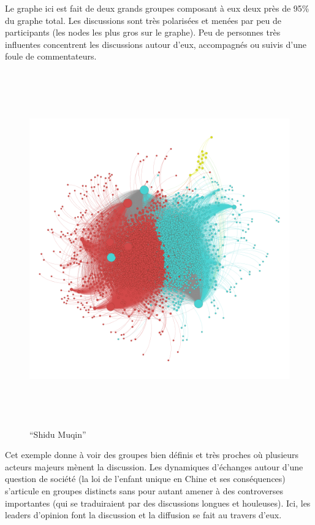 Le graphe ici est fait de deux grands groupes composant \`a eux deux
pr\`es de 95\% du graphe total. Les discussions sont tr\`es
polaris\'ees et men\'ees par peu de participants (les nodes les plus
gros sur le graphe). Peu de personnes tr\`es influentes concentrent les
discussions autour d{\textquoteright}eux, accompagn\'es ou suivis
d{\textquoteright}une foule de commentateurs. 

\begin{figure}
    \centering
    \includegraphics[width=6.0114in,height=6.0114in]{figures/chap3/chapitre3-img18.png}
    \caption{{\textquotedblleft}Shidu Muqin{\textquotedblright}}
\end{figure}


Cet exemple donne \`a voir des groupes bien d\'efinis et tr\`es proches
o\`u plusieurs acteurs majeurs m\`enent la discussion. Les dynamiques
d{\textquoteright}\'echanges autour d{\textquoteright}une question de
soci\'et\'e (la loi de l{\textquoteright}enfant unique en Chine et ses
cons\'equences) s{\textquoteright}articule en groupes distincts sans
pour autant amener \`a des controverses importantes (qui se
traduiraient par des discussions longues et houleuses). Ici, les
leaders d{\textquoteright}opinion font la discussion et la diffusion se
fait au travers d{\textquoteright}eux.

